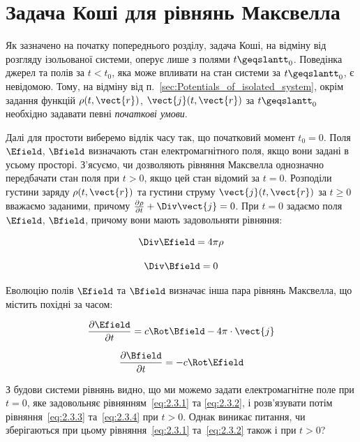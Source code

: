 \section{Задача Коші для рівнянь Максвелла}\label{sec:Cauchi}

Як зазначено на початку попереднього розділу, задача Коші, на відміну від розгляду ізольованої системи, оперує лише з полями \( t \geqslantt_0 \). Поведінка
джерел та полів за \( t < t_0 \), яка може впливати на стан системи за \( t \geqslantt_0 \), є невідомою. Тому, на відміну від п.~\ref{sec:Potentials_of_isolated_system}, окрім задання функцій
\( \rho(t, \vect{r}) \), \( \vect{j}(t, \vect{r}) \) за \( t \geqslantt_0 \) необхідно задавати певні \emph{початкові умови}.

Далі для простоти виберемо відлік часу так, що початковий момент \( t_0 = 0 \). Поля \( \Efield \), \( \Bfield \) визначають стан електромагнітного
поля, якщо вони задані в усьому просторі. З’ясуємо, чи дозволяють рівняння Максвелла однозначно передбачати стан поля при \( t > 0 \), якщо цей стан
відомий за \( t = 0 \). Розподіли густини заряду \( \rho(t, \vect{r}) \) та густини струму \( \vect{j}(t, \vect{r}) \) за \( t \geqslant0 \) вважаємо
заданими, причому \(\frac{\partial\rho}{\partial t} + \Div\vect{j} = 0\). При \( t = 0 \) задаємо поля \( \Efield \), \( \Bfield \), причому вони мають задовольняти рівняння:

\begin{equation}
\Div \Efield = 4\pi\rho \label{eq:2.3.1}
\end{equation}

\begin{equation}
\Div \Bfield = 0 \label{eq:2.3.2}
\end{equation}

Еволюцію полів \( \Efield \) та \( \Bfield \) визначає інша пара рівнянь Максвелла, що містить похідні за часом:

\begin{equation}
\frac{\partial \Efield}{\partial t} = c \Rot \Bfield - 4\pi \cdot \vect{j} \label{eq:2.3.3}
\end{equation}

\begin{equation}
\frac{\partial \Bfield}{\partial t} = -c \Rot \Efield \label{eq:2.3.4}
\end{equation}

З будови системи рівнянь видно, що ми можемо задати електромагнітне поле при \( t = 0 \), яке задовольняє рівнянням~\eqref{eq:2.3.1} та
\eqref{eq:2.3.2}, і розв’язувати потім рівняння~\eqref{eq:2.3.3} та~\eqref{eq:2.3.4} при \( t > 0 \). Однак виникає питання, чи зберігаються при цьому
рівняння~\eqref{eq:2.3.1} та~\eqref{eq:2.3.2} також і при \( t > 0 \)?

